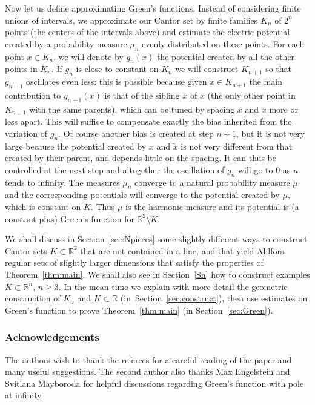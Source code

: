 \documentclass[10pt]{amsart}
\let\sm\setminus
\let\wt\widetilde
\numberwithin{equation}{section}
\theoremstyle{plain}
\theoremstyle{definition}
\newcommand{\R}{\mathbb{R}}
\begin{document}
Now let us define approximating Green's functions. Instead of considering finite unions of intervals,
we approximate our Cantor set by finite families $K_n$ of $2^n$ points (the centers of the intervals above)
and estimate the electric potential created by a probability measure $\mu_n$ evenly distributed on these points.
For each point $x\in K_n$, we will denote by $g_n(x)$ the potential created by all the other points in $K_n$.
If $g_n$ is close to constant on $K_n$ we will construct $K_{n+1}$ so that $g_{n+1}$ oscillates even less: this is possible because given $x\in K_{n+1}$ the main contribution to $g_{n+1}(x)$ is that of the sibling $\wt x$ of $x$ (the only other point in $K_{n+1}$ with the same parents), which can be tuned by spacing $x$ and $\wt x$ more or less apart. This will suffice
to compensate exactly the bias inherited from the variation of $g_n$. Of course another bias is created at step $n+1$, but it is not very large because the potential created by $x$ and $\wt x$ is not very different from that created by their parent, and depends little on the spacing. It can thus be controlled at the next step and altogether the oscillation of $g_n$ will go to $0$
as $n$ tends to infinity.
The measures $\mu_n$ converge to a natural probability measure $\mu$ and the corresponding potentials will
converge to the potential created by $\mu$, which is constant on $K$.
Thus $\mu$ is the harmonic measure and its potential is (a constant plus) Green's
function for $\R^2\sm K$.

We shall discuss in Section~\ref{sec:Npieces}
some slightly different ways to construct Cantor sets $K \subset \R^2$ that are not contained in a line,
and that yield Ahlfors regular sets of slightly larger dimensions that satisfy the properties of Theorem~\ref{thm:main}.
We shall also see in Section~\ref{Sn} how to construct examples $K \subset \R^n$, $n \geq 3$. In the
mean time we explain with more detail the geometric construction of $K_n$ and $K \subset \R$
(in~Sec\-tion~\ref{sec:construct}), then use estimates on Green's function to prove
Theorem~\ref{thm:main} (in Section~\ref{sec:Green}).

\subsubsection*{Acknowledgements}
The authors wish to thank the referees for a careful reading of the paper and many useful suggestions. The second author also thanks Max Engelstein and Svitlana Mayboroda for helpful discussions regar\-ding Green's function with pole at infinity.
\end{document}
